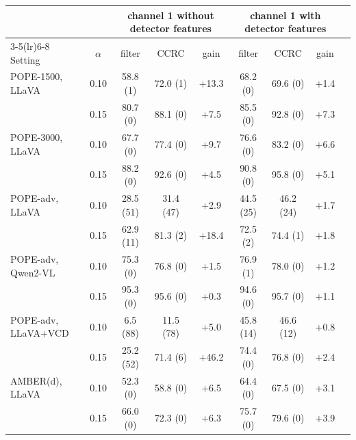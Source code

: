 \begin{tabular}{lcccccccc}
\toprule
 & & \multicolumn{3}{c}{channel 1 without detector features} & \multicolumn{3}{c}{channel 1 with detector features}\\
\cmidrule(lr){3-5}\cmidrule(lr){6-8}
Setting & $\alpha$ & filter & CCRC & gain & filter & CCRC & gain\\
\midrule
POPE-1500, LLaVA & 0.10 & 58.8 (1) & 72.0 (1) & +13.3 & 68.2 (0) & 69.6 (0) & +1.4\\
 & 0.15 & 80.7 (0) & 88.1 (0) & +7.5 & 85.5 (0) & 92.8 (0) & +7.3\\
\addlinespace
POPE-3000, LLaVA & 0.10 & 67.7 (0) & 77.4 (0) & +9.7 & 76.6 (0) & 83.2 (0) & +6.6\\
 & 0.15 & 88.2 (0) & 92.6 (0) & +4.5 & 90.8 (0) & 95.8 (0) & +5.1\\
\addlinespace
POPE-adv, LLaVA & 0.10 & 28.5 (51) & 31.4 (47) & +2.9 & 44.5 (25) & 46.2 (24) & +1.7\\
 & 0.15 & 62.9 (11) & 81.3 (2) & +18.4 & 72.5 (2) & 74.4 (1) & +1.8\\
\addlinespace
POPE-adv, Qwen2-VL & 0.10 & 75.3 (0) & 76.8 (0) & +1.5 & 76.9 (1) & 78.0 (0) & +1.2\\
 & 0.15 & 95.3 (0) & 95.6 (0) & +0.3 & 94.6 (0) & 95.7 (0) & +1.1\\
\addlinespace
POPE-adv, LLaVA+VCD & 0.10 & 6.5 (88) & 11.5 (78) & +5.0 & 45.8 (14) & 46.6 (12) & +0.8\\
 & 0.15 & 25.2 (52) & 71.4 (6) & +46.2 & 74.4 (0) & 76.8 (0) & +2.4\\
\addlinespace
AMBER(d), LLaVA & 0.10 & 52.3 (0) & 58.8 (0) & +6.5 & 64.4 (0) & 67.5 (0) & +3.1\\
 & 0.15 & 66.0 (0) & 72.3 (0) & +6.3 & 75.7 (0) & 79.6 (0) & +3.9\\
\bottomrule
\end{tabular}

